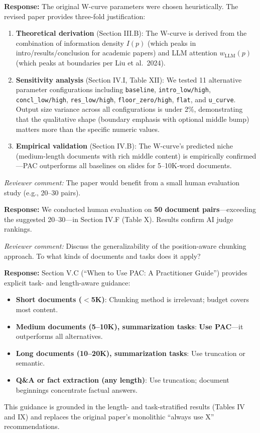 \documentclass[11pt]{article}
\newcommand{\rcomment}[1]{\noindent\textcolor{revcomment}{\textit{Reviewer comment:}} #1\medskip}
\newcommand{\rresponse}[1]{\noindent\textcolor{response}{\textbf{Response:}} #1\medskip\medskip}
\begin{document}
\rresponse{The original W-curve parameters were chosen heuristically. The revised paper provides three-fold justification:
\begin{enumerate}
    \item \textbf{Theoretical derivation} (Section III.B): The W-curve is derived from the combination of information density $I(p)$ (which peaks in intro/results/conclusion for academic papers) and LLM attention $w_{\text{LLM}}(p)$ (which peaks at boundaries per Liu et al.\ 2024).
    \item \textbf{Sensitivity analysis} (Section IV.I, Table XII): We tested 11 alternative parameter configurations including \texttt{baseline}, \texttt{intro\_low/high}, \texttt{concl\_low/high}, \texttt{res\_low/high}, \texttt{floor\_zero/high}, \texttt{flat}, and \texttt{u\_curve}. Output size variance across all configurations is under 2\%, demonstrating that the qualitative shape (boundary emphasis with optional middle bump) matters more than the specific numeric values.
    \item \textbf{Empirical validation} (Section IV.B): The W-curve's predicted niche (medium-length documents with rich middle content) is empirically confirmed---PAC outperforms all baselines on slides for 5--10K-word documents.
\end{enumerate}}

\rcomment{The paper would benefit from a small human evaluation study (e.g., 20--30 pairs).}

\rresponse{We conducted human evaluation on \textbf{50 document pairs}---exceeding the suggested 20--30---in Section IV.F (Table X). Results confirm AI judge rankings.}

\rcomment{Discuss the generalizability of the position-aware chunking approach. To what kinds of documents and tasks does it apply?}

\rresponse{Section V.C (``When to Use PAC: A Practitioner Guide'') provides explicit task- and length-aware guidance:
\begin{itemize}
    \item \textbf{Short documents ($<$5K)}: Chunking method is irrelevant; budget covers most content.
    \item \textbf{Medium documents (5--10K), summarization tasks}: \textbf{Use PAC}---it outperforms all alternatives.
    \item \textbf{Long documents (10--20K), summarization tasks}: Use truncation or semantic.
    \item \textbf{Q\&A or fact extraction (any length)}: Use truncation; document beginnings concentrate factual answers.
\end{itemize}
This guidance is grounded in the length- and task-stratified results (Tables IV and IX) and replaces the original paper's monolithic ``always use X'' recommendations.}
\end{document}
